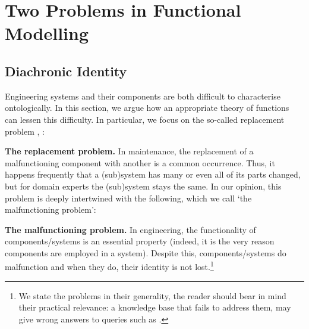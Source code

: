 \documentclass[
]{ceurart}
\begin{document}
\section{Two Problems in Functional Modelling}

\subsection{Diachronic Identity}\label{subsec:identity}
Engineering systems and their components are both difficult to characterise ontologically. %
In this section, we argue how an appropriate theory of functions can lessen this difficulty. %
In particular, we focus on the so-called replacement problem \cite{guarinoArtefactualSystemsMissing2014},  \cite[Chapter 14]{westDevelopingHighQuality2011}:
\bflist
\item[\mypb{replacement}] \textbf{The replacement problem.} In maintenance, the replacement of a malfunctioning component
with another is a common occurrence. Thus, it happens frequently that a (sub)system has many or even all of its parts changed, but for domain experts the (sub)system stays the same. 
\eflist
In our opinion, this problem is deeply intertwined with the following, which we call `the malfunctioning problem':
\bflist
\item[\mypb{malfunctioning}] \textbf{The malfunctioning problem.} In engineering, the functionality of components/systems is an essential property (indeed, it is the very reason components are employed in a system). Despite this, components/systems do malfunction and when they do, their identity is not lost.\footnote{We state the problems in their generality, the reader should bear in mind their practical relevance: a knowledge base that fails to address them, may give wrong answers to queries such as .} 
\end{document}
